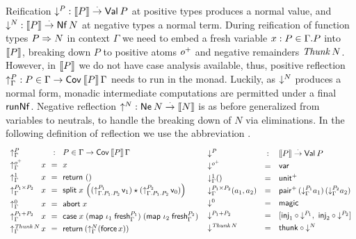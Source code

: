 \documentclass[a4paper,USenglish,cleveref, autoref]{lipics-v2019}
\begin{document}
Reification $\mathord{\downarrow_{}^{P}} : \mathopen{{[\kern-0.14em[}} P \mathclose{{]\kern-0.14em]}} \stackrel{\cdot}{\to} \mathsf{Val}^{}\,P$ at positive types produces
a normal value, and $\mathord{\downarrow_{}^{N}} : \mathopen{{[\kern-0.14em[}} P \mathclose{{]\kern-0.14em]}} \stackrel{\cdot}{\to} \mathsf{Nf}\,N$ at negative types a
normal term.  During reification of function types $P \Rightarrow N$ in
context $\Gamma$ we need to embed a fresh variable
$x : P \in \Gamma.P$ into $\mathopen{{[\kern-0.14em[}} P \mathclose{{]\kern-0.14em]}}$, breaking down $P$ to
positive atoms $o^+$ and negative remainders $\mathit{Thunk}\,N$.
However, in $\mathopen{{[\kern-0.14em[}} P \mathclose{{]\kern-0.14em]}}$ we do not have case analysis available, thus,
positive reflection $\mathord{\uparrow_{\Gamma}^{P}} : P \in \Gamma \to \mathsf{Cov}^{}\,\mathopen{{[\kern-0.14em[}} P \mathclose{{]\kern-0.14em]}}\,\Gamma$
needs to run in the monad.  Luckily, as $\mathord{\downarrow_{}^{N}}$ produces a normal
form, monadic intermediate computations are permitted under a final
$\mathsf{runNf}^{}$.  Negative reflection $\mathord{\uparrow_{}^{N}} : \mathsf{Ne}^{}\,N \stackrel{\cdot}{\to} \mathopen{{[\kern-0.14em[}} N \mathclose{{]\kern-0.14em]}}$ is as
before generalized from variables to neutrals, to handle the breaking
down of $N$ via eliminations.
%
In the following definition of reflection we use the abbreviation
.
\[
\def\arraystretch{1.3}
\begin{array}{l@{\,}l@{~~}c@{~~}l}
  \multicolumn 2 l {\upG P} & : & P \in \Gamma \to \Cov\,\den P \, \Gamma\\
  \upG {\patom}         & x & = & x \\
  \upG {\tyone}         & x & = & \treturn\;\ttempty \\
  \upG {P_1 \times P_2} & x & = & \tsplit\;x\,
    \left(
     (\up[\cext{\cext \Gamma {P_1}}{P_2}]{P_1}\,\vv1)
     \star
     (\up[\cext{\cext \Gamma {P_1}}{P_2}]{P_2}\,\vv0)
    \right) \\
  \upG{\tyzero}         & x & = & \tabort\;x \\
  \upG{P_1 + P_2}       & x & = & \tcase\;x
    \; (\tmap\;\iota_1\;\tfresh^{P_1}_\Gamma)
    \; (\tmap\;\iota_2\;\tfresh^{P_2}_\Gamma)
    \\
  \upG{\Thunk N} & x & = & \treturn\,(\upG N (\tforce\,x)) \\
\end{array}
\,
\begin{array}{lcl}
  \down P & : & \den P \todot \tVal\,P \\
  \down {\patom} & = & \tvar \\
  \downG {\tyone} () & = & \punit \\
  \downG {P_1 \times P_2}(a_1,a_2) & = & \ppair
    \,(\downG {P_1} a_1)
    \,(\downG {P_2} a_2)
    \\
  \down {\tyzero} & = & \tmagic \\
  \down {P_1 + P_2} & = &
    [  \tinj_1 \comp \down{P_1}
    ,\ \tinj_2 \comp \down{P_2}
    ] \\
  \down {\Thunk N} & = & \tthunk \circ \down N \\
\end{array}
\]
\end{document}
